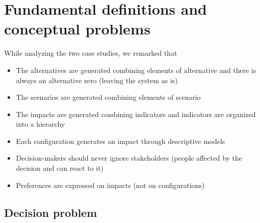 \chapter{Fundamental definitions and conceptual problems}
\label{ch:fundamentaldefinitions}

While analyzing the two case studies, we remarked that
\begin{itemize}
	\item The alternatives are generated combining elements of alternative and there is always an alternative zero (leaving the system as is)
	
	\item The scenarios are generated combining elements of scenario
	
	\item The impacts are generated combining indicators and indicators are organized into a hierarchy
	
	\item Each configuration generates an impact through descriptive models
	
	\item Decision-makers should never ignore stakeholders (people affected by the decision and can react to it)
	
	\item Preferences are expressed on impacts (not on configurations)
\end{itemize}

\section{Decision problem}
\label{sec:decproblemdef}

